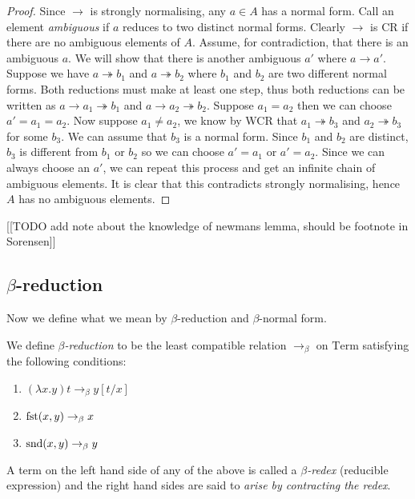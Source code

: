 \begin{proof}
    Since $\to$ is strongly normalising, any $a \in A$ has a normal form. Call an element \emph{ambiguous} if $a$ reduces to two distinct normal forms. Clearly $\to$ is CR if there are no ambiguous elements of $A$.
    Assume, for contradiction, that there is an ambiguous $a$. We will show that there is another ambiguous $a'$ where $a \to a'$.
    Suppose we have $a \twoheadrightarrow b_1$ and $a \twoheadrightarrow b_2$ where $b_1$ and $b_2$ are two different normal forms. Both reductions must make at least one step, thus both reductions can be written as $a \to a_1 \twoheadrightarrow b_1$ and $a \to a_2 \twoheadrightarrow b_2$.
    Suppose $a_1 = a_2$ then we can choose $a' = a_1 = a_2$. Now suppose $a_1 \neq a_2$, we know by WCR that $a_1 \twoheadrightarrow b_3$ and $a_2 \twoheadrightarrow b_3$ for some $b_3$. We can assume that $b_3$ is a normal form. Since $b_1$ and $b_2$ are distinct, $b_3$ is different from $b_1$ or $b_2$ so we can choose $a' = a_1$ or $a'=a_2$.
    Since we can always choose an $a'$, we can repeat this process and get an infinite chain of ambiguous elements. It is clear that this contradicts strongly normalising, hence $A$ has no ambiguous elements.
\end{proof}


[[TODO add note about the knowledge of newmans lemma, should be footnote in Sorensen]]



\subsection{ \texorpdfstring{$\beta$}{}-reduction}

Now we define what we mean by $\beta$-reduction and $\beta$-normal form.

\begin{defin}\label{beta_reduction}
    We define \emph{$\beta$-reduction} to be the least compatible relation $\to_{\beta}$ on $\mathrm{Term}$ satisfying the following conditions:
    \begin{enumerate}
        \item $(\lambda x . y)t \to_{\beta} y [t / x]$
        \item $\mathrm{fst}(x,y) \to_{\beta} x$
        \item $\mathrm{snd}(x,y) \to_{\beta} y$
    \end{enumerate}
    A term on the left hand side of any of the above is called a \emph{$\beta$-redex} (reducible expression) and the right hand sides are said to \emph{arise by contracting the redex}.
\end{defin}

